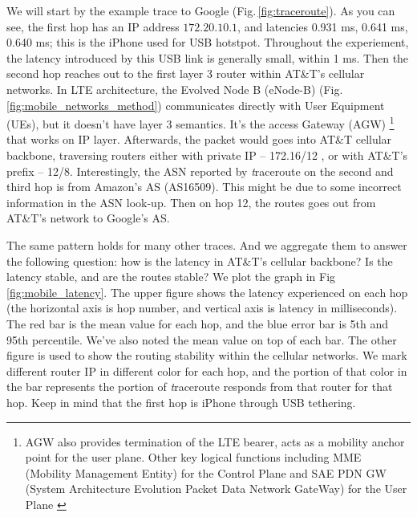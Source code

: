We will start by the example trace to Google (Fig.\,\ref{fig:traceroute}). As you can see, the first hop has an IP address $172.20.10.1$, and latencies 0.931 ms, 0.641 ms, 0.640 ms; this is the iPhone used for USB hotstpot. Throughout the experiement, the latency introduced by this USB link is generally small, within 1 ms. Then the second hop reaches out to the first layer 3 router within AT\&T's cellular networks. In LTE architecture, the Evolved Node B (eNode-B) (Fig.\,\ref{fig:mobile_networks_method}) communicates directly with User Equipment (UEs), but it doesn't have layer 3 semantics. It's the access Gateway (AGW) \footnote{AGW also provides termination of the LTE bearer, acts as a mobility anchor point for the user plane. Other key logical functions including MME (Mobility Management Entity) for the Control Plane and SAE PDN GW (System Architecture Evolution Packet Data Network GateWay) for the User Plane \cite{nortel}} that works on IP layer. Afterwards, the packet would goes into AT\&T cellular backbone, traversing routers either with private IP -- 172.16/12 \cite{rekhterrfc}, or with AT\&T's prefix -- 12/8. Interestingly, the ASN reported by {\textit traceroute} on the second and third hop is from Amazon's AS (AS16509). This might be due to some incorrect information in the ASN look-up. Then on hop 12, the routes goes out from AT\&T's network to Google's AS.

The same pattern holds for many other traces. And we aggregate them to answer the following question: how is the latency in AT\&T's cellular backbone? Is the latency stable, and are the routes stable? We plot the graph in Fig\,\ref{fig:mobile_latency}. The upper figure shows the latency experienced on each hop (the horizontal axis is hop number, and vertical axis is latency in milliseconds). The red bar is the mean value for each hop, and the blue error bar is 5th and 95th percentile. We've also noted the mean value on top of each bar. The other figure is used to show the routing stability within the cellular networks. We mark different router IP in different color for each hop, and the portion of that color in the bar represents the portion of {\textit traceroute} responds from that router for that hop. Keep in mind that the first hop is iPhone through USB tethering. 

